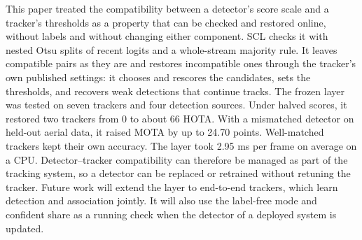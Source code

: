 \documentclass[pdflatex,sn-mathphys-num,iicol]{sn-jnl}
\newcommand{\scl}{SCL}
\begin{document}
This paper treated the compatibility between a detector's score scale and a tracker's thresholds
as a property that can be checked and restored online, without labels and without changing either
component. \scl{} checks it with nested Otsu splits of recent logits and a whole-stream majority
rule. It leaves compatible pairs as they are and restores incompatible ones through the tracker's
own published settings: it chooses and rescores the candidates, sets the thresholds, and recovers
weak detections that continue tracks. The frozen layer was tested on seven trackers and four
detection sources. Under halved scores, it restored two trackers from 0 to about 66 HOTA. With a
mismatched detector on held-out aerial data, it raised MOTA by up to 24.70 points. Well-matched
trackers kept their own accuracy. The layer took 2.95 ms
per frame on average on a CPU. Detector--tracker compatibility can therefore be managed as part of
the tracking system, so a detector can be replaced or retrained without retuning the tracker.
Future work will extend the layer to end-to-end trackers, which learn detection and association
jointly. It will also use the label-free mode and confident share as a running check when the
detector of a deployed system is updated.

\FloatBarrier
\backmatter

\makeatletter\def\bibfont{\reset@font\fontfamily{\rmdefault}\footnotesize\selectfont}\makeatother
\setlength{\bibsep}{2pt plus 1pt}
\end{document}
